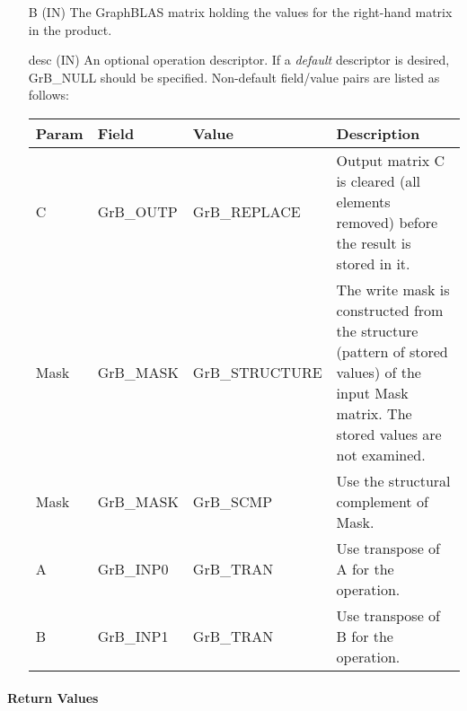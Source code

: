\begin{itemize}[leftmargin=1.1in]
    \item[{\sf B}]    ({\sf IN}) The GraphBLAS matrix holding the values for
    the right-hand matrix in the product.

    \item[{\sf desc}] ({\sf IN}) An optional operation descriptor. If
    a \emph{default} descriptor is desired, {\sf GrB\_NULL} should be
    specified. Non-default field/value pairs are listed as follows:  \\

    \hspace*{-2em}\begin{tabular}{lllp{2.7in}}
        Param & Field  & Value & Description \\
        \hline
        {\sf C}    & {\sf GrB\_OUTP} & {\sf GrB\_REPLACE} & Output matrix {\sf C}
        is cleared (all elements removed) before the result is stored in it.\\

        {\sf Mask} & {\sf GrB\_MASK} & {\sf GrB\_STRUCTURE}   & The write mask is
        constructed from the structure (pattern of stored values) of the input
        {\sf Mask} matrix. The stored values are not examined.\\

        {\sf Mask} & {\sf GrB\_MASK} & {\sf GrB\_SCMP}   & Use the structural
        complement of {\sf Mask}. \\

        {\sf A}    & {\sf GrB\_INP0} & {\sf GrB\_TRAN}   & Use transpose of {\sf A}
        for the operation. \\

        {\sf B}    & {\sf GrB\_INP1} & {\sf GrB\_TRAN}   & Use transpose of {\sf B}
        for the operation. \\
    \end{tabular}
\end{itemize}

\paragraph{Return Values}

